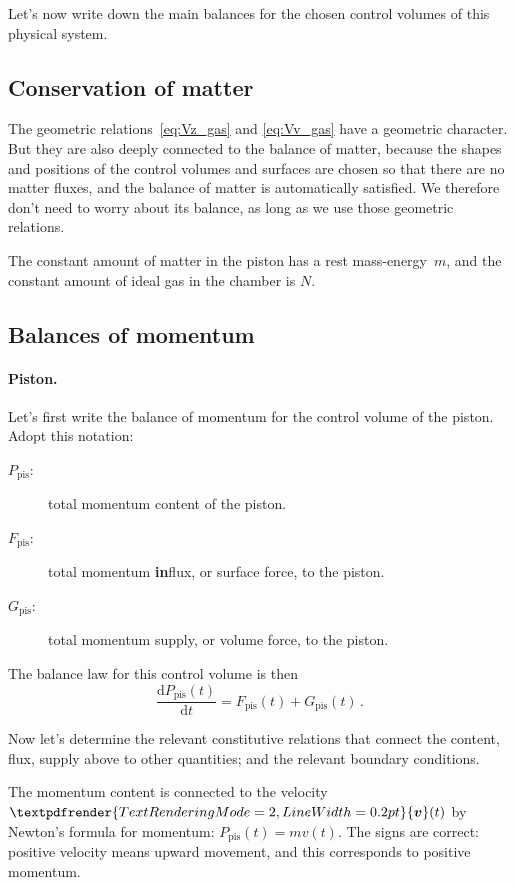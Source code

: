 \documentclass[a4paper,12pt,%
onecolumn,oneside,%
british%
]{memoir}
\renewcommand*{\bm}[1]{\textpdfrender{TextRenderingMode=2,LineWidth=0.2pt}{\boldsymbol{#1}}}
\newcommand*{\di}{\mathrm{d}}%
\renewcommand*{\|}[1][]{\nonscript\:#1\vert\nonscript\:\mathopen{}}
\newcommand*{\masse}{mass-energy}
\newcommand*{\yv}{\bm{v}}
\newcommand*{\dt}{\di t}
\newcommand*{\yN}{N}
\newcommand*{\ym}{m}%
\newcommand*{\yPpi}{P_{\textrm{pis}}}
\newcommand*{\yGpi}{G_{\textrm{pis}}}
\newcommand*{\yFpi}{F_{\textrm{pis}}}
\begin{document}
\medskip

Let's now write down the main balances for the chosen control volumes of this physical system.

\subsection{Conservation of matter}
\label{sec:idealgas_ex_matter}

The geometric relations~\eqref{eq:Vz_gas} and \eqref{eq:Vv_gas} have a geometric character. But they are also deeply connected to the balance of matter, because the shapes and positions of the control volumes and surfaces are chosen so that there are no matter fluxes, and the balance of matter is automatically satisfied. We therefore don't need to worry about its balance, as long as we use those geometric relations.

The constant amount of matter in the piston has a rest \masse\ $\ym$, and the constant amount of ideal gas in the chamber is $\yN$.

\subsection{Balances of momentum}
\label{sec:idealgas_ex_momentum}

\paragraph{Piston.}

Let's first write the balance of momentum for the control volume of the piston. Adopt this notation:
\begin{description}
\item[$\yPpi$:] total momentum content of the piston.
\item[$\yFpi$:] total momentum \textbf{in}flux, or surface force, to the piston.
\item[$\yGpi$:] total momentum supply, or volume force, to the piston.
\end{description}
The balance law for this control volume is then
\begin{equation*}
      \frac{\di \yPpi(t)}{\dt} = \yFpi(t) + \yGpi(t) \,.
\end{equation*}

Now let's determine the relevant constitutive relations that connect the content, flux, supply above to other quantities; and the relevant boundary conditions.

The momentum content is connected to the velocity $\yv(t)$ by Newton's formula for momentum: $\yPpi(t) = \ym v(t)$. The signs are correct: positive velocity means upward movement, and this corresponds to positive momentum.
\end{document}
